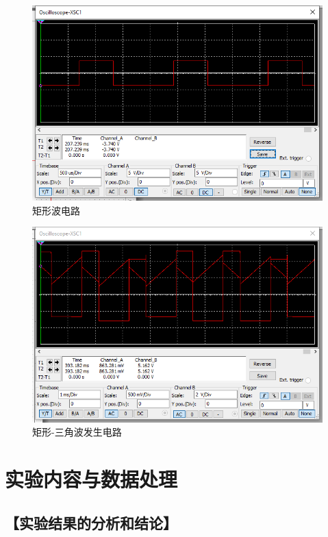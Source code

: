 \documentclass{ctexart}
\let\oldsubsection\subsection
\renewcommand{\subsection}[1]{\oldsubsection{\!\!\!\!\!\!【#1】}}
\begin{document}


\begin{figure}[H]
  \centering
  \includegraphics[width=0.75\linewidth]{电路设计/矩形波电路/矩形波电路示波器图像.png}
  \caption{矩形波电路}
\end{figure}



\begin{figure}[H]
  \centering
  \includegraphics[width=0.75\linewidth]{电路设计/矩形-三角波发生电路/矩形-三角波发生电路示波器.png}
  \caption{矩形-三角波发生电路}
\end{figure}

\newpage

\section{实验内容与数据处理}

\subsection{实验结果的分析和结论}
\end{document}
